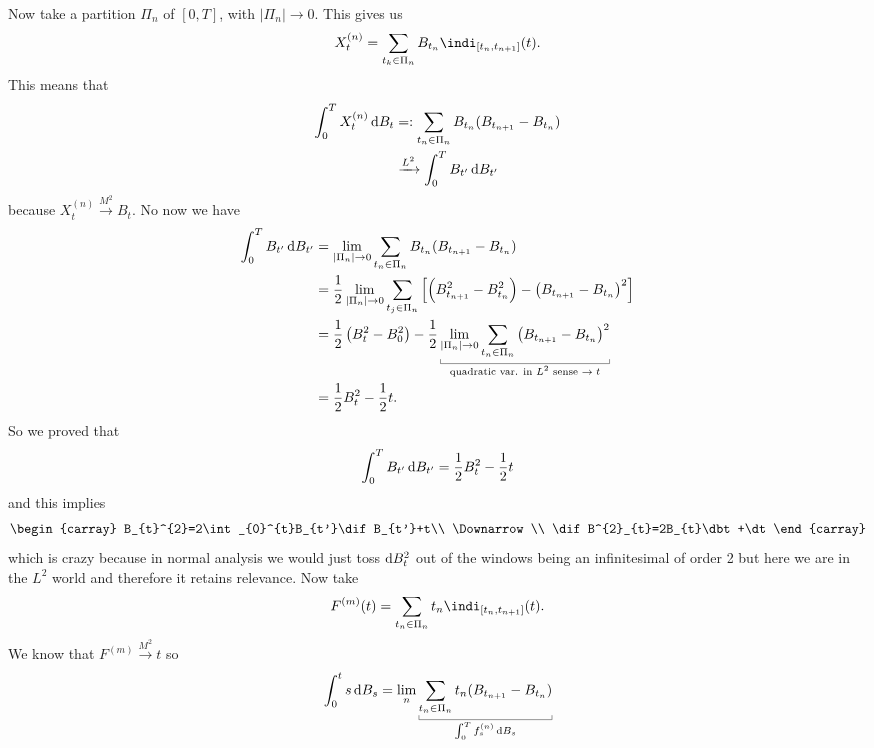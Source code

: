 \documentclass[12pt]{report}
\begin{document}
Now take a partition $\Pi_{n}$ of $[0,T]$, with $|\Pi_{n}|\to0$. This gives us
\begin{equation*}
	X_{t}^{(n)}=\sum_{t_{k}\in\Pi_{n}}B_{t_{n}}\indi_{[t_{n},t_{n+1}]}(t).
\end{equation*} 
This means that
\begin{align*}
	\int_{0}^{T}X_{t}^{(n)}\mathop{}\!\mathrm{d} B_{t}&=:\sum_{t_{n}\in\Pi_{n}}B_{t_{n}}(B_{t_{n+1}}-B_{t_{n}})\\
	&\xrightarrow{L^{2}}\int_{0}^{T}B_{t'}\mathop{}\!\mathrm{d} B_{t'}
\end{align*}
because $X^{(n)}_{t}\xrightarrow{M^{2}}B_{t}$. No now we have
\begin{align*}
	\int_{0}^{T}B_{t'}\dif B_{t'}&=\lim_{|\Pi_{n}|\to0}\sum_{t_{n}\in\Pi_{n}}B_{t_{n}}(B_{t_{n+1}}-B_{t_{n}})\\
	&=\unmezz\lim_{|\Pi_{n}|\to0}\sum_{t_{j}\in\Pi_{n}}\left[\left(B^{2}_{t_{n+1}}-B^{2}_{t_{n}}\right)-\left(B_{t_{n+1}}-B_{t_{n}}\right)^{2}\right]\\
	&=\unmezz\left(B^{2}_{t}-B^{2}_{0}\right)-\unmezz\ubracketthin{\lim_{|\Pi_{n}|\to0}\sum_{t_{n}\in\Pi_{n}}\left(B_{t_{n+1}}-B_{t_{n}}\right)^{2}}_{\claptext{quadratic var. in $L^{2}$ sense $\to t$}}\\
	&=\unmezz B^{2}_{t}-\unmezz t.
\end{align*}
So we proved that 
\begin{equation*}
	\int_{0}^{T}B_{t'}\mathop{}\!\mathrm{d} B_{t'}=\frac{1}{2} B^{2}_{t}-\frac{1}{2} t
\end{equation*}
and this implies
\begin{equation*}
	\begin{carray}
		B_{t}^{2}=2\int_{0}^{t}B_{t'}\dif B_{t'}+t\\
		\Downarrow\\
		\dif B^{2}_{t}=2B_{t}\dbt+\dt
	\end{carray}
\end{equation*}
which is crazy because in normal analysis we would just toss $\mathop{}\!\mathrm{d} B^{2}_{t}$ out of the windows being an infinitesimal of order 2 but here we are in the $L^{2}$ world and therefore it retains relevance. Now take
\begin{equation*}
	F^{(m)}(t)=\sum_{t_{n}\in\Pi_{n}}t_{n}\indi_{[t_{n},t_{n+1}]}(t).
\end{equation*}
We know that $F^{(m)}\xrightarrow{M^{2}}t$ so
\begin{equation*}
	\int_{0}^{t}s\dbs=\lim_{n}\ubracketthin{\sum_{t_{n}\in\Pi_{n}}t_{n}(B_{t_{n+1}}-B_{t_{n}})}_{\int_{0}^{T}f_{s}^{(n)}\dbs}
\end{equation*}
\end{document}
